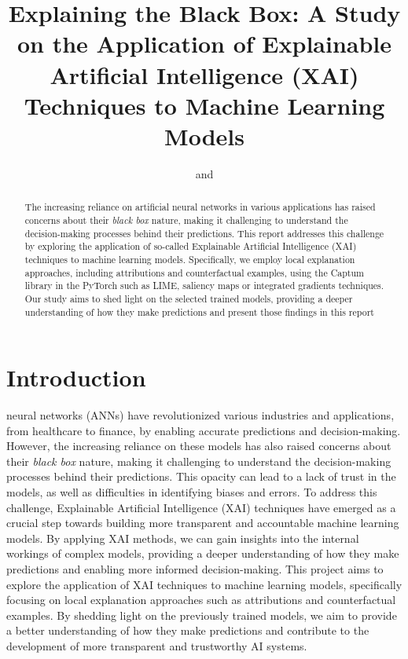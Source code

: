 \documentclass[journal, a4paper]{IEEEtran}
\begin{document}
\title{Explaining the Black Box: A Study on the Application of Explainable Artificial Intelligence (XAI) Techniques to Machine Learning Models}
\author{
    \large
    and
    \\[1ex]
    \normalsize
}


\maketitle

\begin{abstract}
    The increasing reliance on artificial neural networks in various applications has raised concerns about their \textit{black box} nature, making it challenging to understand the decision-making processes behind their predictions.
    This report addresses this challenge by exploring the application of so-called Explainable Artificial Intelligence (XAI) techniques to machine learning models.
    Specifically, we employ local explanation approaches, including attributions and counterfactual examples, using the Captum library in the PyTorch such as LIME, saliency maps or integrated gradients techniques.
    Our study aims to shed light on the selected trained models, providing a deeper understanding of how they make predictions and present those findings in this report
\end{abstract}

\section{Introduction}\label{sec:introduction}

 neural networks (ANNs) have revolutionized various industries and applications, from healthcare to finance, by enabling accurate predictions and decision-making.
However, the increasing reliance on these models has also raised concerns about their \textit{black box} nature, making it challenging to understand the decision-making processes behind their predictions.
This opacity can lead to a lack of trust in the models, as well as difficulties in identifying biases and errors.
To address this challenge, Explainable Artificial Intelligence (XAI) techniques have emerged as a crucial step towards building more transparent and accountable machine learning models.
By applying XAI methods, we can gain insights into the internal workings of complex models, providing a deeper understanding of how they make predictions and enabling more informed decision-making.
This project aims to explore the application of XAI techniques to machine learning models, specifically focusing on local explanation approaches such as attributions and counterfactual examples.
By shedding light on the previously trained models, we aim to provide a better understanding of how they make predictions and contribute to the development of more transparent and trustworthy AI systems.
\end{document}
